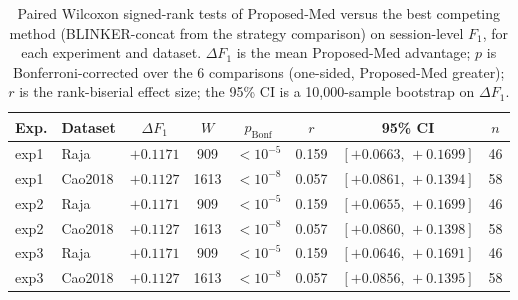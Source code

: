 \begin{table}[ht]
  \centering
  \caption{Paired Wilcoxon signed-rank tests of Proposed-Med versus the best competing method (BLINKER-concat from the strategy comparison) on session-level $F_1$, for each experiment and dataset. $\Delta F_1$ is the mean Proposed-Med advantage; $p$ is Bonferroni-corrected over the 6 comparisons (one-sided, Proposed-Med greater); $r$ is the rank-biserial effect size; the 95\% CI is a 10{,}000-sample bootstrap on $\Delta F_1$.}
  \label{tab:exp_stats}
  \begin{tabular}{llcccccc}
    \toprule
    Exp. & Dataset & $\Delta F_1$ & $W$ & $p_{\mathrm{Bonf}}$ & $r$ & 95\% CI & $n$ \\
    \midrule
    exp1 & Raja & $+0.1171$ & 909 & $<10^{-5}$ & 0.159 & $[+0.0663,\,+0.1699]$ & 46 \\
    exp1 & Cao2018 & $+0.1127$ & 1613 & $<10^{-8}$ & 0.057 & $[+0.0861,\,+0.1394]$ & 58 \\
    exp2 & Raja & $+0.1171$ & 909 & $<10^{-5}$ & 0.159 & $[+0.0655,\,+0.1699]$ & 46 \\
    exp2 & Cao2018 & $+0.1127$ & 1613 & $<10^{-8}$ & 0.057 & $[+0.0860,\,+0.1398]$ & 58 \\
    exp3 & Raja & $+0.1171$ & 909 & $<10^{-5}$ & 0.159 & $[+0.0646,\,+0.1691]$ & 46 \\
    exp3 & Cao2018 & $+0.1127$ & 1613 & $<10^{-8}$ & 0.057 & $[+0.0856,\,+0.1395]$ & 58 \\
    \bottomrule
  \end{tabular}
\end{table}
